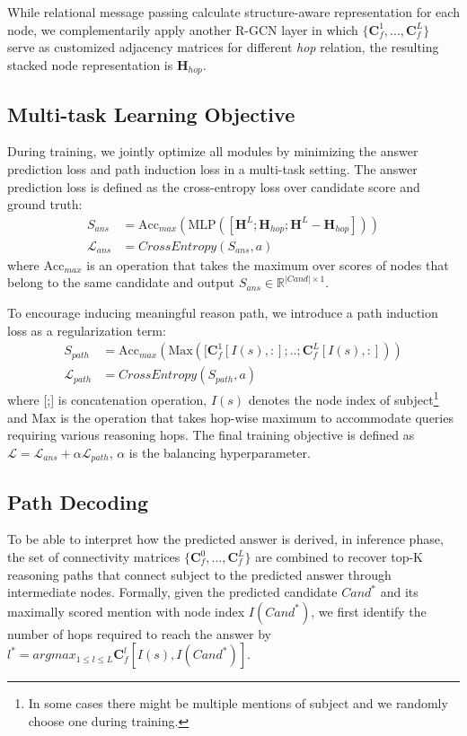 While relational message passing calculate structure-aware representation for each node, we complementarily apply another R-GCN layer in which $\{\bm{C}_f^1,...,\bm{C}_f^L\}$ serve as customized adjacency matrices for different \textit{hop} relation, the resulting stacked node representation is $\bm{H}_{hop}$.
\subsection{Multi-task Learning Objective}
During training, we jointly optimize all modules by minimizing the answer prediction loss and path induction loss in a multi-task setting. The answer prediction loss is defined as the cross-entropy loss over candidate score and ground truth:
\begin{align}
	S_{ans} &= \text{Acc}_{max}(\text{MLP}([\bm{H}^L;\bm{H}_{hop};\bm{H}^L-\bm{H}_{hop}])) \\
	\mathcal{L}_{ans} &= CrossEntropy(S_{ans}, a)
\end{align}
where $\text{Acc}_{max}$ is an operation that takes the maximum over scores of nodes that belong to the same candidate and output $S_{ans}\in \mathbb{R}^{|Cand|\times 1}$.

To encourage inducing meaningful reason path, we introduce a path induction loss as a regularization term:
\begin{align}
	S_{path} &= \text{Acc}_{max}(\text{Max}([\bm{C}_f^1[I(s),:];..;\bm{C}_f^L[I(s),:])) \\
	\mathcal{L}_{path} &= CrossEntropy(S_{path}, a)
\end{align}
where [;] is concatenation operation, $I(s)$ denotes the node index of subject\footnote{In some cases there might be multiple mentions of subject and we randomly choose one during training.} and $\text{Max}$ is the operation that takes hop-wise maximum to accommodate queries requiring various reasoning hops. The final training objective is defined as $\mathcal{L} = \mathcal{L}_{ans}+\alpha \mathcal{L}_{path}$, $\alpha$ is the balancing hyperparameter.

\subsection{Path Decoding}
To be able to interpret how the predicted answer is derived, in inference phase, the set of connectivity matrices $\{\bm{C}_f^0,...,\bm{C}_f^L\}$ are combined to recover top-K reasoning paths that connect subject to the predicted answer through intermediate nodes. Formally, given the predicted candidate $Cand^*$ and its maximally scored mention with node index $I(Cand^*)$, we first identify the number of hops required to reach the answer by $l^*=argmax_{1\leq l\leq L}\bm{C}_{f}^{l}[I(s),I(Cand^*)]$.

